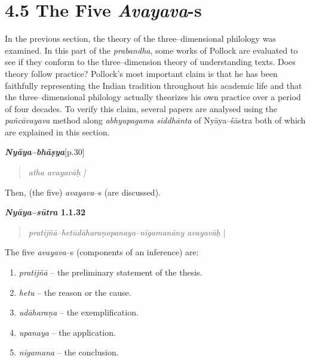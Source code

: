 \vspace{-.3cm}

\section*{4.5 The Five {\it {\bfseries Avayava}}-s}

In the previous section, the theory of the three–dimensional philology was examined. In this part of the \textit{prabandha}, some works of Pollock are evaluated to see if they conform to the three–dimension theory of understanding texts. Does theory follow practice? Pollock’s most important claim is that he has been faithfully representing the Indian tradition throughout his academic life and that the three–dimensional philology actually theorizes his own practice over a period of four decades. To verify this claim, several papers are analysed using the \textit{pañcāvayava} method along \textit{abhyupagama siddhānta} of Nyāya–śāstra both of which are explained in this section.

\textit{\textbf{Nyāya–bhāṣya}}[p.30]

\vspace{-.3cm}

\begin{verse}
\textit{atha avayavāḥ |}
\end{verse}

\vspace{-.3cm}

Then, (the five) \textit{avayava}–s (are discussed).

\textbf{\textit{Nyāya–sūtra} 1.1.32}

\vspace{-.3cm}

\begin{verse}
\textit{pratijñā–hetūdāharaṇopanaya–nigamanāny avayavāḥ} |
\end{verse}

\vspace{-.3cm}

The five \textit{avayava}–s (components of an inference) are:

\begin{enumerate}
\itemsep=0pt
\item \textit{pratijñā} – the preliminary statement of the thesis.

 \item \textit{hetu} – the reason or the cause.

 \item \textit{udāharaṇa} – the exemplification.

 \item \textit{upanaya} – the application.

 \item \textit{nigamana} – the conclusion.

\end{enumerate}

